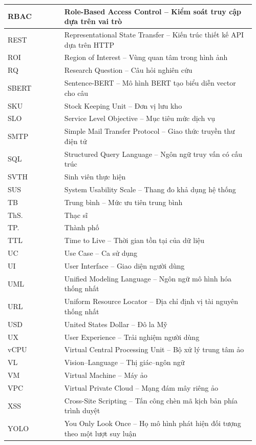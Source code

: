 \begin{longtable}{|p{0.22\linewidth}|p{0.74\linewidth}|}
RBAC & Role-Based Access Control -- Kiểm soát truy cập dựa trên vai trò \\ \hline
REST & Representational State Transfer -- Kiến trúc thiết kế API dựa trên HTTP \\ \hline
ROI & Region of Interest -- Vùng quan tâm trong hình ảnh \\ \hline
RQ & Research Question -- Câu hỏi nghiên cứu \\ \hline
SBERT & Sentence-BERT -- Mô hình BERT tạo biểu diễn vector cho câu \\ \hline
SKU & Stock Keeping Unit -- Đơn vị lưu kho \\ \hline
SLO & Service Level Objective -- Mục tiêu mức dịch vụ \\ \hline
SMTP & Simple Mail Transfer Protocol -- Giao thức truyền thư điện tử \\ \hline
SQL & Structured Query Language -- Ngôn ngữ truy vấn có cấu trúc \\ \hline
SVTH & Sinh viên thực hiện \\ \hline
SUS & System Usability Scale -- Thang đo khả dụng hệ thống \\ \hline
TB & Trung bình -- Mức ưu tiên trung bình \\ \hline
ThS. & Thạc sĩ \\ \hline
TP. & Thành phố \\ \hline
TTL & Time to Live -- Thời gian tồn tại của dữ liệu \\ \hline
UC & Use Case -- Ca sử dụng \\ \hline
UI & User Interface -- Giao diện người dùng \\ \hline
UML & Unified Modeling Language -- Ngôn ngữ mô hình hóa thống nhất \\ \hline
URL & Uniform Resource Locator -- Địa chỉ định vị tài nguyên thống nhất \\ \hline
USD & United States Dollar -- Đô la Mỹ \\ \hline
UX & User Experience -- Trải nghiệm người dùng \\ \hline
vCPU & Virtual Central Processing Unit -- Bộ xử lý trung tâm ảo \\ \hline
VL & Vision--Language -- Thị giác--ngôn ngữ \\ \hline
VM & Virtual Machine -- Máy ảo \\ \hline
VPC & Virtual Private Cloud -- Mạng đám mây riêng ảo \\ \hline
XSS & Cross-Site Scripting -- Tấn công chèn mã kịch bản phía trình duyệt \\ \hline
YOLO & You Only Look Once -- Họ mô hình phát hiện đối tượng theo một lượt suy luận \\ \hline
\end{longtable}
